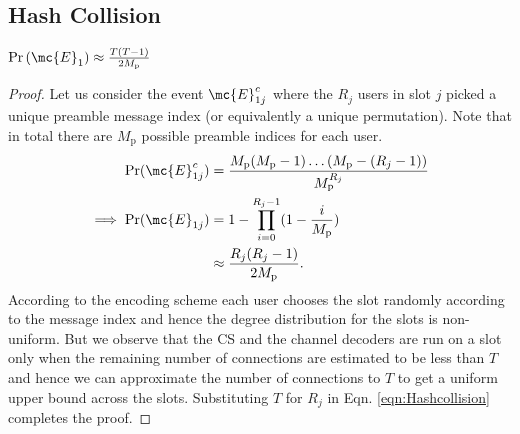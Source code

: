 \documentclass[final,onecolumn,12pt]{IEEEtran}
\def\Pr{\mathrm{Pr}}
\begin{document}
\subsection{Hash Collision}
\begin{lemma}
$\Pr \left(\mc{E}_{1}\right)\approx \frac{T(T-1)}{2M_\mathrm{p}}$	
\label{lem:hashCollision}\\
\end{lemma}
\begin{proof}
Let us consider the event $\mc{E}_{1j}^c$ where the $R_j$ users in slot $j$ picked a unique preamble message index (or equivalently a unique permutation). Note that in total there are $M_\mathrm{p}$ possible preamble indices for each user.
\begin{align}
\Pr(\mc{E}_{1j}^c)&=\frac{M_\mathrm{p}(M_\mathrm{p}-1)\ldots(M_\mathrm{p}-(R_j-1))}{M_\mathrm{p}^{R_j}}\notag\\
\implies \Pr(\mc{E}_{1j})&=1-\prod_{i=0}^{R_j-1}(1-\frac{i}{M_\mathrm{p}})\notag\\
&\approx \frac{R_j(R_j-1)}{2M_\mathrm{p}}.\label{eqn:Hashcollision}
\end{align}
According to the encoding scheme each user chooses the slot randomly according to the message index and hence the degree distribution for the slots is non-uniform. But we observe that the CS and the channel decoders are run on a slot only when the remaining number of connections are estimated to be less than $T$ and hence we can approximate the number of connections to $T$ to get a uniform upper bound  across the slots. Substituting $T$ for $R_j$ in Eqn. \eqref{eqn:Hashcollision} completes the proof.
\end{proof}
\end{document}
